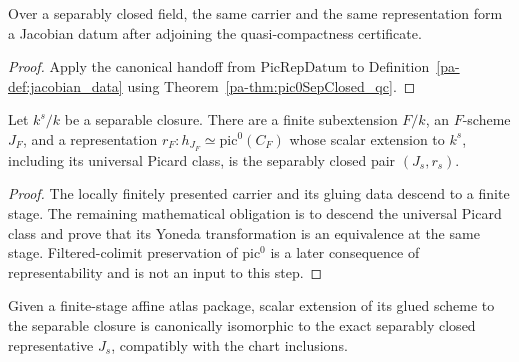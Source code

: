 \begin{theorem}
  \label{pa-thm:pic0SepClosedDescentInput_exists}
  \leanok

  Over a separably closed field, the same carrier and the same representation form a Jacobian
  datum after adjoining the quasi-compactness certificate.
\end{theorem}
\begin{proof}
  \leanok
  Apply the canonical handoff from \(\mathrm{PicRepDatum}\) to
  Definition~\ref{pa-def:jacobian_data} using Theorem~\ref{pa-thm:pic0SepClosed_qc}.
\end{proof}

\begin{theorem}
  \label{pa-thm:pic0DescentCompatibility}
  \notready
  Let \(k^s/k\) be a separable closure.  There are a finite subextension \(F/k\), an
  \(F\)-scheme \(J_F\), and a representation
  \(r_F:h_{J_F}\simeq\mathrm{pic}^0(C_F)\) whose scalar extension to \(k^s\), including its
  universal Picard class, is the separably closed pair \((J_s,r_s)\).
\end{theorem}
\begin{proof}
  The locally finitely presented carrier and its gluing data descend to a finite stage.  The
  remaining mathematical obligation is to descend the universal Picard class and prove that
  its Yoneda transformation is an equivalence at the same stage.  Filtered-colimit
  preservation of \(\mathrm{pic}^0\) is a later consequence of representability and is not an
  input to this step.
\end{proof}

\begin{definition}
  \label{pa-def:pic0FiniteStageBaseChangeIso}

  Given a finite-stage affine atlas package, scalar extension of its glued scheme to the
  separable closure is canonically isomorphic to the exact separably closed representative
  \(J_s\), compatibly with the chart inclusions.
\end{definition}

